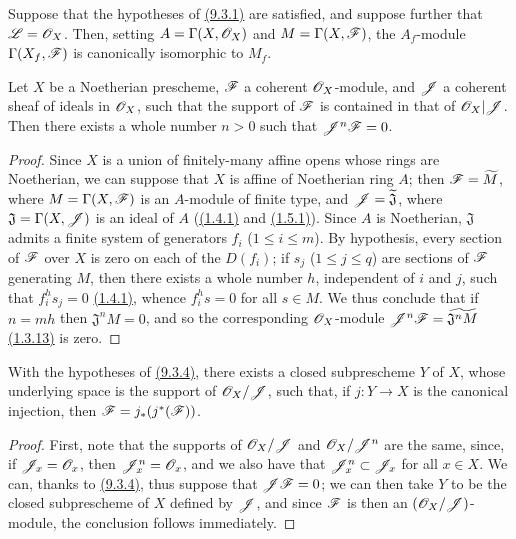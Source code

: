 \begin{cor}[9.3.3]
\label{cor-1.9.3.3}
Suppose that the hypotheses of \hyperref[thm-1.9.3.1]{(9.3.1)} are satisfied, and suppose further that
$\mathscr{L}=\mathscr{O}_X$. Then, setting $A=\Gamma(X,\mathscr{O}_X)$ and $M=\Gamma(X,\mathscr{F})$, the $A_f$-module
$\Gamma(X_f,\mathscr{F})$ is canonically isomorphic to $M_f$.
\end{cor}

\begin{prop}[9.3.4]
\label{prop-1.9.3.4}
Let $X$ be a Noetherian prescheme, $\mathscr{F}$ a coherent $\mathscr{O}_X$-module, and $\mathscr{J}$ a
coherent sheaf of ideals in $\mathscr{O}_X$, such that the support of $\mathscr{F}$ is contained in that
of $\mathscr{O}_X|\mathscr{J}$. Then there exists a whole number $n>0$ such that $\mathscr{J}^n\mathscr{F}=0$.
\end{prop}

\begin{proof}
\label{proof-prop-1.9.3.4}
Since $X$ is a union of finitely-many affine opens whose rings are Noetherian, we can suppose
that $X$ is affine of Noetherian ring $A$; then $\mathscr{F}=\widetilde{M}$, where
$M=\Gamma(X,\mathscr{F})$ is an $A$-module of finite type, and $\mathscr{J}=\widetilde{\mathfrak{J}}$,
where $\mathfrak{J}=\Gamma(X,\mathscr{J})$ is an ideal of $A$ (\hyperref[thm-1.1.4.1]{(1.4.1)} and
\hyperref[thm-1.1.5.1]{(1.5.1)}). Since $A$ is Noetherian, $\mathfrak{J}$ admits a finite system of
generators $f_i$ ($1\leqslant i\leqslant m$). By hypothesis, every section of $\mathscr{F}$ over
$X$ is zero on each of the $D(f_i)$; if $s_j$ ($1\leqslant j\leqslant q$) are sections of
$\mathscr{F}$ generating $M$, then there exists a whole number $h$, independent of $i$ and $j$,
such that $f_i^h s_j=0$ \hyperref[thm-1.1.4.1]{(1.4.1)}, whence $f_i^h s=0$ for all $s\in M$. We thus
conclude that if $n=mh$ then $\mathfrak{J}^n M=0$, and so the corresponding $\mathscr{O}_X$-module
$\mathscr{J}^n\mathscr{F}=\widetilde{\mathfrak{J}^n M}$ \hyperref[env-1.1.3.13]{(1.3.13)} is zero.
\end{proof}

\begin{cor}[9.3.5]
\label{cor-1.9.3.5}
With the hypotheses of \hyperref[prop-1.9.3.4]{(9.3.4)}, there exists a closed subprescheme $Y$ of $X$,
whose underlying space is the support of $\mathscr{O}_X/\mathscr{J}$, such that, if $j:Y\to X$ is the
canonical injection, then $\mathscr{F}=j_*(j^*(\mathscr{F}))$.
\end{cor}

\begin{proof}
\label{proof-cor-1.9.3.5}
First, note that the supports of $\mathscr{O}_X/\mathscr{J}$ and $\mathscr{O}_X/\mathscr{J}^n$ are the same,
since, if $\mathscr{J}_x=\mathscr{O}_x$, then $\mathscr{J}_x^n=\mathscr{O}_x$, and we also have that
$\mathscr{J}_x^n\subset\mathscr{J}_x$ for all $x\in X$. We can, thanks to \hyperref[prop-1.9.3.4]{(9.3.4)}, thus
suppose that $\mathscr{J}\mathscr{F}=0$; we can then take $Y$ to be the closed subprescheme of $X$
defined by $\mathscr{J}$, and since $\mathscr{F}$ is then an $(\mathscr{O}_X/\mathscr{J})$-module, the conclusion
follows immediately.
\end{proof}

